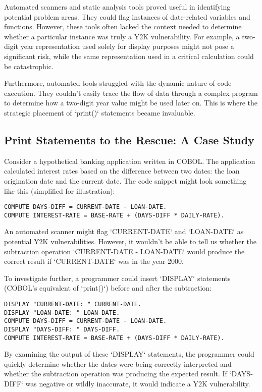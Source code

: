\documentclass{article}
\begin{document}
{{{{Automated scanners and static analysis tools proved useful in identifying potential problem areas. They could flag instances of date-related variables and functions. However, these tools often lacked the context needed to determine whether a particular instance was truly a Y2K vulnerability. For example, a two-digit year representation used solely for display purposes might not pose a significant risk, while the same representation used in a critical calculation could be catastrophic.

Furthermore, automated tools struggled with the dynamic nature of code execution. They couldn't easily trace the flow of data through a complex program to determine how a two-digit year value might be used later on. This is where the strategic placement of `print()` statements became invaluable.

\subsection*{Print Statements to the Rescue: A Case Study}

Consider a hypothetical banking application written in COBOL. The application calculated interest rates based on the difference between two dates: the loan origination date and the current date. The code snippet might look something like this (simplified for illustration):

\begin{verbatim}
COMPUTE DAYS-DIFF = CURRENT-DATE - LOAN-DATE.
COMPUTE INTEREST-RATE = BASE-RATE + (DAYS-DIFF * DAILY-RATE).
\end{verbatim}

An automated scanner might flag `CURRENT-DATE` and `LOAN-DATE` as potential Y2K vulnerabilities. However, it wouldn't be able to tell us whether the subtraction operation `CURRENT-DATE - LOAN-DATE` would produce the correct result if `CURRENT-DATE` was in the year 2000.

To investigate further, a programmer could insert `DISPLAY` statements (COBOL's equivalent of `print()`) before and after the subtraction:

\begin{verbatim}
DISPLAY "CURRENT-DATE: " CURRENT-DATE.
DISPLAY "LOAN-DATE: " LOAN-DATE.
COMPUTE DAYS-DIFF = CURRENT-DATE - LOAN-DATE.
DISPLAY "DAYS-DIFF: " DAYS-DIFF.
COMPUTE INTEREST-RATE = BASE-RATE + (DAYS-DIFF * DAILY-RATE).
\end{verbatim}

By examining the output of these `DISPLAY` statements, the programmer could quickly determine whether the dates were being correctly interpreted and whether the subtraction operation was producing the expected result. If `DAYS-DIFF` was negative or wildly inaccurate, it would indicate a Y2K vulnerability.

}}}}
\end{document}
